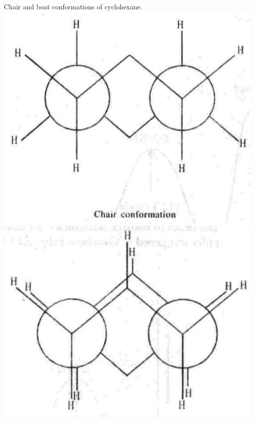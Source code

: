 \documentclass[10pt]{article}
\begin{document}
Chair and boat conformations of cyclohexane.\\
\includegraphics[max width=\textwidth, center]{2025_01_28_8470952b98110cec3aabg-062(1)}\\
\includegraphics[max width=\textwidth, center]{2025_01_28_8470952b98110cec3aabg-062(2)}
\end{document}
